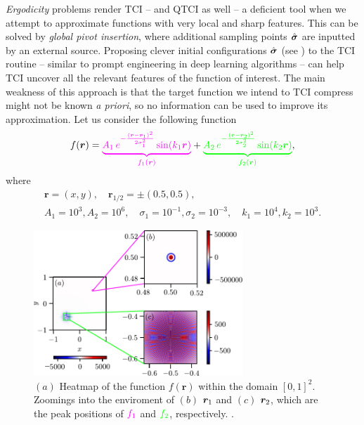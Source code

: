 \textit{Ergodicity} problems render TCI -- and QTCI as well -- a deficient tool when we attempt to approximate functions with very local and sharp features. 
This can be solved by \textit{global pivot insertion}, where additional sampling points $\hat{\boldsymbol{\sigma}}$ are inputted by an external source. Proposing clever initial configurations $\hat{\boldsymbol{\sigma}}$ (see ) to the TCI routine -- similar to prompt engineering in deep learning algorithms -- can help TCI uncover all the relevant features of the function of interest. The main weakness of this approach is that the target function we intend to TCI compress might not be known \emph{a priori}, so no information can be used to improve its approximation.
Let us consider the following function 
\begin{gather}
		f(\boldsymbol{r}) ={\color{mymagenta} \underbrace{A_1\, e^{-\frac{(\boldsymbol{r} - \boldsymbol{r}_1)^2}{2\sigma^2_1}} \sin(k_1\boldsymbol{r})}_{f_1(\boldsymbol{r})}} + {\color{green} \underbrace{A_2\, e^{-\frac{(\boldsymbol{r} - \boldsymbol{r}_2)^2}{2\sigma^2_2}} \sin(k_2\boldsymbol{r})}_{f_2(\br)}},
		\label{eq:localFunc}
\end{gather}
	where
\[
\begin{gathered}
	\boldsymbol{r} = (x,y), \quad \boldsymbol{r}_{1/2} = \pm( 0.5, 0.5),\\[6pt]
	A_1 = 10^{3}, A_2 = 10^6, \quad \sigma_1 = 10^{-1}, \sigma_2 = 10^{-3}, \quad k_1 = 10^4, k_2 = 10^3. 
\end{gathered}
\]
\begin{figure}[ht!]
	\centering
	\includegraphics[width=0.7\textwidth]{figures/Heatmap_localised_func.pdf}
	\caption{ $(a)$ Heatmap of the function $f(\boldsymbol{r})$ within the domain $[0,1]^2$. Zoomings into the enviroment of $(b)$ $\boldsymbol{r}_1$ and $(c)$ $\boldsymbol{r}_2$, which are the peak positions of ${\color{mymagenta} f_1}$ and ${\color{green} f_2}$, respectively. .}
	\label{fig:localFunc}
\end{figure}

